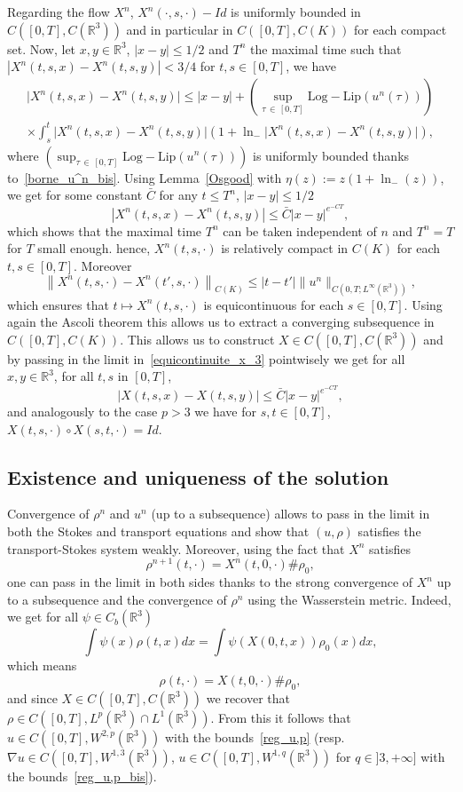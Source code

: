 \documentclass[10pt]{amsart}
\theoremstyle{definition}\newtheorem{defi}[theo]{Definition}\newtheorem{rema}[theo]{Remark}\newtheorem{exam}[theo]{Example}\newtheorem{exem}[theo]{Example}\newtheorem{nota}[theo]{Notation}
\newcommand{\LLip}{\mathrm{Log-Lip}}
\newcommand{\R}{\mathbb{R}}
\renewcommand{\leq}{\leqslant}
\begin{document}
Regarding the flow $X^n$, $X^n(\cdot,s,\cdot)-Id$ is uniformly bounded in $ C([0,T], C(\R^3))$ and in particular in $ C([0,T], C(K))$ for each compact set. Now, let $x,y \in \R^3$, $|x-y|\leq 1/2$ and $T^n$ the maximal time such that $|X^n(t,s,x)-X^n(t,s,y)|<3/4 $ for $t,s \in[0,T]$, we have
\begin{multline*}
\big|X^n(t,s,x)-X^n(t,s,y)\big|\leq |x-y|+\left(\underset{\tau\,\in\,[0,T]}{\sup}\LLip\left(u^n(\tau)\right) \right) \\
\times \int_s^t \big|X^n(t,s,x)-X^n(t,s,y)\big|\left(1+\ln_{-} \big|X^n(t,s,x)-X^n(t,s,y)\big|\right),
\end{multline*}
where $({\sup}_{\tau\,\in\,[0,T]}\LLip(u^n(\tau)))$ is uniformly bounded thanks to~\eqref{borne_u^n_bis}. Using Lemma~\ref{Osgood} with $\eta(z):=z(1+\ln_{-}(z))$, we get for some constant $\bar C$ for any $t\leq T^n$, $|x-y|\leq1/2$
\begin{equation}\label{equicontinuite_x_3}
\left|X^n(t,s,x)-X^n(t,s,y)\right| \leq \bar{C}|x-y|^{e^{-CT}},
\end{equation}
which shows that the maximal time $T^n$ can be taken independent of $n$ and $T^n=T$ for $T$ small enough. hence, $X^n(t,s,\cdot)$ is relatively compact in $ C(K)$ for each $t,s \in [0,T]$. Moreover
\[
\left\|X^n(t,s,\cdot)-X^n(t',s,\cdot)\right\|_{ C(K)}\leq |t-t'| \| u^n\|_{ C\left(0,T;L^\infty(\R^3)\right)},
\]
which ensures that $t\mapsto X^n(t,s,\cdot) $ is equicontinuous for each $s\in[0,T]$. Using again the Ascoli theorem this allows us to extract a converging subsequence in $ C([0,T], C(K))$. This allows us to construct $X\in C([0,T], C(\R^3))$ and by passing in the limit in~\eqref{equicontinuite_x_3} pointwisely we get for all $x,y \in \R^3$, for all $t,s$ in $[0,T]$,
\[
|X(t,s,x)-X(t,s,y)| \leq \bar{C}|x-y|^{e^{-CT}},
\]
and analogously to the case $p>3$ we have for $s,t\in[0,T]$, $ X(t,s,\cdot) \circ X(s,t,\cdot)= Id. $


\subsection{Existence and uniqueness of the solution}


Convergence of $\rho^n$ and $u^n$ (up to a subsequence) allows to pass in the limit in both the Stokes and transport equations and show that $(u,\rho)$ satisfies the transport-Stokes system weakly. Moreover, using the fact that $X^n $ satisfies
\[
\rho^{n+1}(t,\cdot)= X^n(t,0,\cdot)\#\rho_0,
\]
one can pass in the limit in both sides thanks to the strong convergence of $X^n$ up to a subsequence and the convergence of $\rho^n$ using the Wasserstein metric. Indeed, we get for all $\psi\in C_b(\R^3)$
\[
\int \psi(x) \rho(t,x) dx =\int \psi(X(0,t,x)) \rho_0(x) dx,
\]
which means
\[
\rho(t,\cdot)= X(t,0,\cdot)\# \rho_0,
\]
and since $X\in C([0,T], C(\R^3))$ we recover that $\rho \in C([0,T], L^p(\R^3) \cap L^1(\R^3)) $. From this it follows that $u \in C([0,T], W^{2,p}(\R^3)) $ with the bounds~\eqref{reg_u,p} (resp. $\nabla u \in C([0,T], W^{1,3}(\R^3))$, $u\in C([0,T],W^{1,q}(\R^3)) $ for $q\in]3,+\infty]$ with the bounds~\eqref{reg_u,p_bis}).
\end{document}
